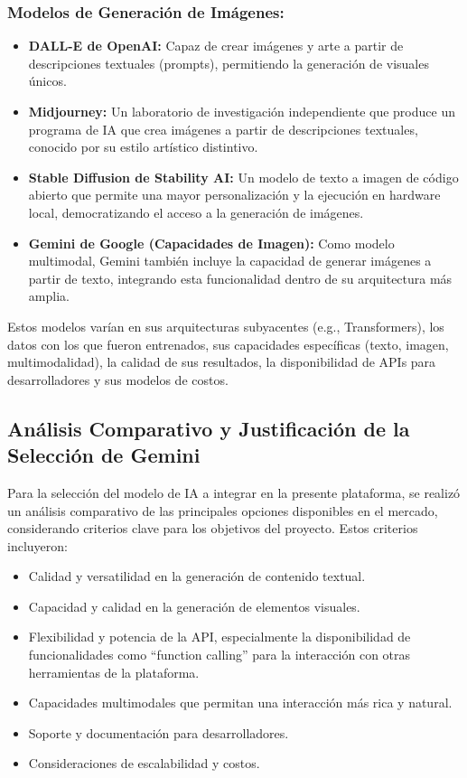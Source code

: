 \documentclass[12pt,a4paper]{report}
\begin{document}
\subsubsection{Modelos de Generación de Imágenes:}

\begin{itemize}
\item \textbf{DALL-E de OpenAI:} Capaz de crear imágenes y arte a partir de descripciones textuales (prompts), permitiendo la generación de visuales únicos.

\item \textbf{Midjourney:} Un laboratorio de investigación independiente que produce un programa de IA que crea imágenes a partir de descripciones textuales, conocido por su estilo artístico distintivo.

\item \textbf{Stable Diffusion de Stability AI:} Un modelo de texto a imagen de código abierto que permite una mayor personalización y la ejecución en hardware local, democratizando el acceso a la generación de imágenes.

\item \textbf{Gemini de Google (Capacidades de Imagen):} Como modelo multimodal, Gemini también incluye la capacidad de generar imágenes a partir de texto, integrando esta funcionalidad dentro de su arquitectura más amplia.
\end{itemize}

Estos modelos varían en sus arquitecturas subyacentes (e.g., Transformers), los datos con los que fueron entrenados, sus capacidades específicas (texto, imagen, multimodalidad), la calidad de sus resultados, la disponibilidad de APIs para desarrolladores y sus modelos de costos.

\subsection{Análisis Comparativo y Justificación de la Selección de Gemini}

Para la selección del modelo de IA a integrar en la presente plataforma, se realizó un análisis comparativo de las principales opciones disponibles en el mercado, considerando criterios clave para los objetivos del proyecto. Estos criterios incluyeron:

\begin{itemize}
\item Calidad y versatilidad en la generación de contenido textual.
\item Capacidad y calidad en la generación de elementos visuales.
\item Flexibilidad y potencia de la API, especialmente la disponibilidad de funcionalidades como ``function calling'' para la interacción con otras herramientas de la plataforma.
\item Capacidades multimodales que permitan una interacción más rica y natural.
\item Soporte y documentación para desarrolladores.
\item Consideraciones de escalabilidad y costos.
\end{itemize}
\end{document}

